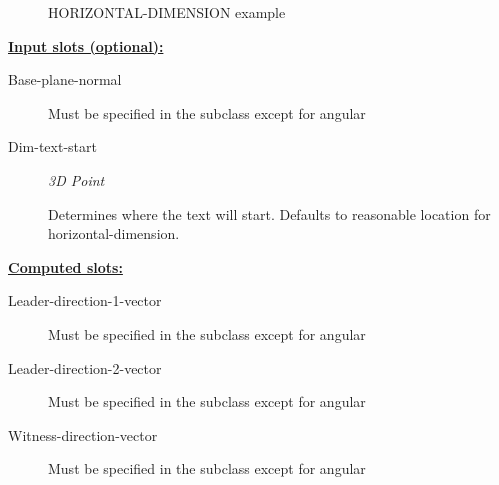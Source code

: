 \documentclass [11pt]{book}
\begin{document}
\begin{itemize}
\begin{figure}
\caption{HORIZONTAL-DIMENSION example}

\label{fig:HORIZONTAL-DIMENSION}

\end{figure}





\textbf{
\underline{Input slots (optional):}}

\begin{description}

\item [Base-plane-normal]

Must be specified in the subclass except for angular




\item [Dim-text-start]
\emph{3D Point}

 Determines where the text will start. Defaults to reasonable location for
horizontal-dimension.




\end{description}






\textbf{
\underline{Computed slots:}}

\begin{description}

\item [Leader-direction-1-vector]

Must be specified in the subclass except for angular




\item [Leader-direction-2-vector]

Must be specified in the subclass except for angular




\item [Witness-direction-vector]

Must be specified in the subclass except for angular




\end{description}








\end{itemize}
\end{document}
